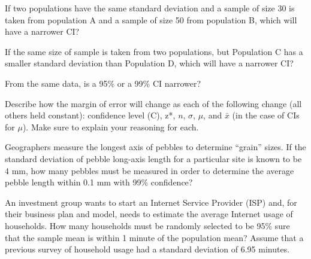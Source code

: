 \documentclass[10pt,openany]{book}\usepackage[]{graphicx}\usepackage[]{color}
\begin{document}
\begin{minipage}{\textwidth}
\begin{exsection}
  \item \label{revex:CIABn} If two populations have the same standard deviation and a sample of size 30 is taken from population A and a sample of size 50 from population B, which will have a narrower CI? 
  \item \label{revex:CIABs} If the same size of sample is taken from two populations, but Population C has a smaller standard deviation than Population D, which will have a narrower CI? 
  \item \label{revex:CIC} From the same data, is a 95\% or a 99\% CI narrower? 
  \item \label{revex:CIdescribe} Describe how the margin of error will change as each of the following change (all others held constant): confidence level (C), z*, $n$, $\sigma$, $\mu$, and $\bar{x}$ (in the case of CIs for $\mu$).  Make sure to explain your reasoning for each. 
  \item \label{revex:CIPebbles} Geographers measure the longest axis of pebbles to determine ``grain'' sizes.  If the standard deviation of pebble long-axis length for a particular site is known to be 4 mm, how many pebbles must be measured in order to determine the average pebble length within 0.1 mm with 99\% confidence? 
  \item \label{revex:CIISP} An investment group wants to start an Internet Service Provider (ISP) and, for their business plan and model, needs to estimate the average Internet usage of households.  How many households must be randomly selected to be 95\% sure that the sample mean is within 1 minute of the population mean?  Assume that a previous survey of household usage had a standard deviation of 6.95 minutes. 
\end{exsection}
\end{minipage}
\end{document}
